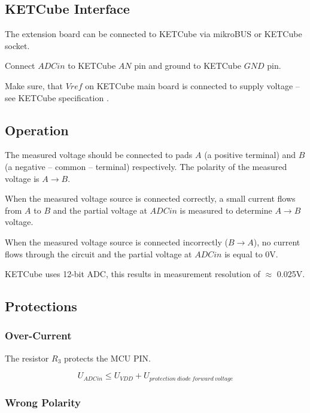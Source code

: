 \subsection{KETCube Interface}
  The extension board can be connected to KETCube via mikroBUS or KETCube socket. 
  
  Connect $ADCin$ to KETCube $AN$ pin and ground to KETCube $GND$ pin.
  
  Make sure, that $Vref$ on KETCube main board is connected to supply voltage -- see KETCube specification \cite{ZCU:KETCube:05-2018}.
  
\clearpage
\subsection{Operation}
  The measured voltage should be connected to pads $A$ (a positive terminal) and $B$ (a negative -- common -- terminal) respectively. The polarity of the measured voltage is $A \rightarrow B$. 

  When the measured voltage source is connected correctly, a small current flows from $A$ to $B$ and the partial voltage at $ADCin$ is measured to determine $A \rightarrow B$ voltage.

  When the measured voltage source is connected incorrectly ($B \rightarrow A$), no current flows through the circuit and the partial voltage at $ADCin$ is equal to 0V.
  
  KETCube  uses 12-bit ADC, this results in measurement resolution of $\approx$ 0.025V.

  
\subsection{Protections}
\subsubsection*{Over-Current}
  The resistor $R_3$ protects the MCU PIN.

\begin{equation}
  U_{ADCin} \leq U_{VDD} + U_{protection~diode~forward~voltage}
\end{equation}
  
\subsubsection*{Wrong Polarity}

